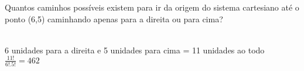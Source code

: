 \begin{ex}
 Quantos caminhos possíveis existem para ir da origem do sistema cartesiano até o ponto (6,5) caminhando apenas para a direita ou para cima?
   \begin{sol}
       \phantom{A} \\
    6 unidades para a direita e 5 unidades para cima = 11 unidades ao todo\\
    $\frac{11!}{6!.5!}= 462$
   \end{sol}
\end{ex}